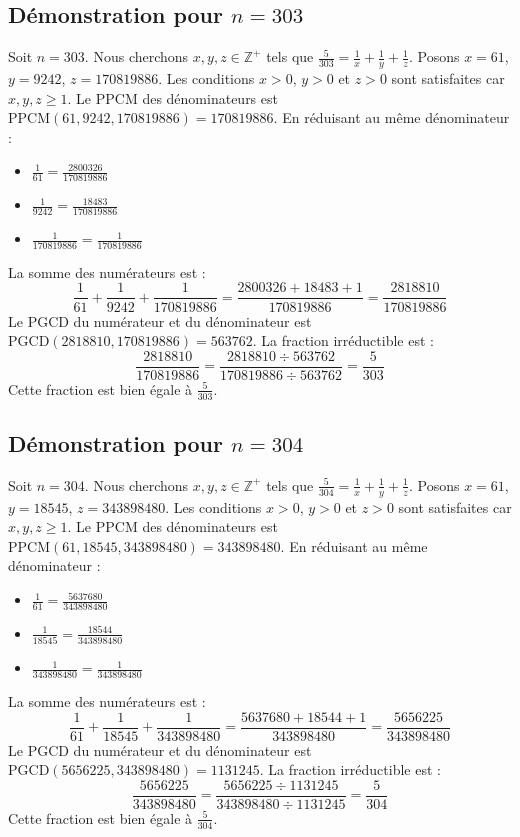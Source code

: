 \documentclass[11pt,a4paper]{article}
\begin{document}
\subsection{Démonstration pour $n = 303$}
Soit $n = 303$. Nous cherchons $x, y, z \in \mathbb{Z}^{+}$ tels que $\frac{5}{303} = \frac{1}{x} + \frac{1}{y} + \frac{1}{z}$.
Posons $x = 61$, $y = 9242$, $z = 170819886$.
Les conditions $x > 0$, $y > 0$ et $z > 0$ sont satisfaites car $x, y, z \geq 1$.
Le PPCM des dénominateurs est $\text{PPCM}(61, 9242, 170819886) = 170819886$.
En réduisant au même dénominateur :
\begin{itemize}
    \item $\frac{1}{61} = \frac{2800326}{170819886}$
    \item $\frac{1}{9242} = \frac{18483}{170819886}$
    \item $\frac{1}{170819886} = \frac{1}{170819886}$
\end{itemize}
La somme des numérateurs est :
$$ \frac{1}{61} + \frac{1}{9242} + \frac{1}{170819886} = \frac{2800326 + 18483 + 1}{170819886} = \frac{2818810}{170819886} $$
Le PGCD du numérateur et du dénominateur est $\text{PGCD}(2818810, 170819886) = 563762$.
La fraction irréductible est :
$$ \frac{2818810}{170819886} = \frac{2818810 \div 563762}{170819886 \div 563762} = \frac{5}{303} $$
Cette fraction est bien égale à $\frac{5}{303}$.

\subsection{Démonstration pour $n = 304$}
Soit $n = 304$. Nous cherchons $x, y, z \in \mathbb{Z}^{+}$ tels que $\frac{5}{304} = \frac{1}{x} + \frac{1}{y} + \frac{1}{z}$.
Posons $x = 61$, $y = 18545$, $z = 343898480$.
Les conditions $x > 0$, $y > 0$ et $z > 0$ sont satisfaites car $x, y, z \geq 1$.
Le PPCM des dénominateurs est $\text{PPCM}(61, 18545, 343898480) = 343898480$.
En réduisant au même dénominateur :
\begin{itemize}
    \item $\frac{1}{61} = \frac{5637680}{343898480}$
    \item $\frac{1}{18545} = \frac{18544}{343898480}$
    \item $\frac{1}{343898480} = \frac{1}{343898480}$
\end{itemize}
La somme des numérateurs est :
$$ \frac{1}{61} + \frac{1}{18545} + \frac{1}{343898480} = \frac{5637680 + 18544 + 1}{343898480} = \frac{5656225}{343898480} $$
Le PGCD du numérateur et du dénominateur est $\text{PGCD}(5656225, 343898480) = 1131245$.
La fraction irréductible est :
$$ \frac{5656225}{343898480} = \frac{5656225 \div 1131245}{343898480 \div 1131245} = \frac{5}{304} $$
Cette fraction est bien égale à $\frac{5}{304}$.
\end{document}
